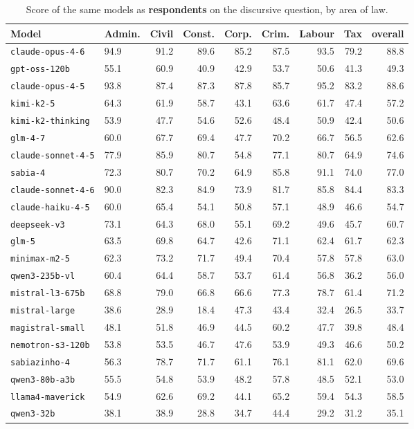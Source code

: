 \documentclass{IOS-Book-Article}
\begin{document}
\begin{table}[!ht]
\centering
\caption{Score of the same models as \textbf{respondents} on the discursive question, by area of law.}
\footnotesize\setlength{\tabcolsep}{2pt}
\begin{tabular}{llrrrrrrr}
\hline
\textbf{Model} & \textbf{Admin.} & \textbf{Civil} & \textbf{Const.} & \textbf{Corp.} & \textbf{Crim.} & \textbf{Labour} & \textbf{Tax} & \textbf{overall} \\
\hline
\texttt{claude-opus-4-6} & 94.9 & 91.2 & 89.6 & 85.2 & 87.5 & 93.5 & 79.2 & 88.8 \\
\texttt{gpt-oss-120b} & 55.1 & 60.9 & 40.9 & 42.9 & 53.7 & 50.6 & 41.3 & 49.3 \\
\texttt{claude-opus-4-5} & 93.8 & 87.4 & 87.3 & 87.8 & 85.7 & 95.2 & 83.2 & 88.6 \\
\texttt{kimi-k2-5} & 64.3 & 61.9 & 58.7 & 43.1 & 63.6 & 61.7 & 47.4 & 57.2 \\
\texttt{kimi-k2-thinking} & 53.9 & 47.7 & 54.6 & 52.6 & 48.4 & 50.9 & 42.4 & 50.6 \\
\texttt{glm-4-7} & 60.0 & 67.7 & 69.4 & 47.7 & 70.2 & 66.7 & 56.5 & 62.6 \\
\texttt{claude-sonnet-4-5} & 77.9 & 85.9 & 80.7 & 54.8 & 77.1 & 80.7 & 64.9 & 74.6 \\
\texttt{sabia-4} & 72.3 & 80.7 & 70.2 & 64.9 & 85.8 & 91.1 & 74.0 & 77.0 \\
\texttt{claude-sonnet-4-6} & 90.0 & 82.3 & 84.9 & 73.9 & 81.7 & 85.8 & 84.4 & 83.3 \\
\texttt{claude-haiku-4-5} & 60.0 & 65.4 & 54.1 & 50.8 & 57.1 & 48.9 & 46.6 & 54.7 \\
\texttt{deepseek-v3} & 73.1 & 64.3 & 68.0 & 55.1 & 69.2 & 49.6 & 45.7 & 60.7 \\
\texttt{glm-5} & 63.5 & 69.8 & 64.7 & 42.6 & 71.1 & 62.4 & 61.7 & 62.3 \\
\texttt{minimax-m2-5} & 62.3 & 73.2 & 71.7 & 49.4 & 70.4 & 57.8 & 57.8 & 63.0 \\
\texttt{qwen3-235b-vl} & 60.4 & 64.4 & 58.7 & 53.7 & 61.4 & 56.8 & 36.2 & 56.0 \\
\texttt{mistral-l3-675b} & 68.8 & 79.0 & 66.8 & 66.6 & 77.3 & 78.7 & 61.4 & 71.2 \\
\texttt{mistral-large} & 38.6 & 28.9 & 18.4 & 47.3 & 43.4 & 32.4 & 26.5 & 33.7 \\
\texttt{magistral-small} & 48.1 & 51.8 & 46.9 & 44.5 & 60.2 & 47.7 & 39.8 & 48.4 \\
\texttt{nemotron-s3-120b} & 53.8 & 53.5 & 46.7 & 47.6 & 53.9 & 49.3 & 46.6 & 50.2 \\
\texttt{sabiazinho-4} & 56.3 & 78.7 & 71.7 & 61.1 & 76.1 & 81.1 & 62.0 & 69.6 \\
\texttt{qwen3-80b-a3b} & 55.5 & 54.8 & 53.9 & 48.2 & 57.8 & 48.5 & 52.1 & 53.0 \\
\texttt{llama4-maverick} & 54.9 & 62.6 & 69.2 & 44.1 & 65.2 & 59.4 & 54.3 & 58.5 \\
\texttt{qwen3-32b} & 38.1 & 38.9 & 28.8 & 34.7 & 44.4 & 29.2 & 31.2 & 35.1 \\
\hline
\end{tabular}
\end{table}
\end{document}
